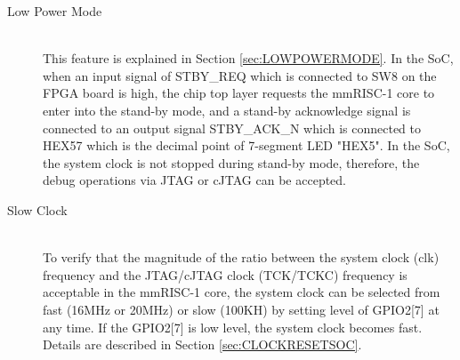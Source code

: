 \begin{description}
    \item[Low Power Mode]\mbox{}\\
    This feature is explained in Section \ref{sec:LOWPOWERMODE}. In the SoC, when an input signal of STBY\_REQ which is connected to SW8 on the FPGA board is high, the chip top layer requests the mmRISC-1 core to enter into the stand-by mode, and a stand-by acknowledge signal is connected to an output signal STBY\_ACK\_N which is connected to HEX57 which is the decimal point of 7-segment LED "HEX5". In the SoC, the system clock is not stopped during stand-by mode, therefore, the debug operations via JTAG or cJTAG can be accepted.

    \item[Slow Clock]\mbox{}\\
    To verify that the magnitude of the ratio between the system clock (clk) frequency and the JTAG/cJTAG clock (TCK/TCKC) frequency is acceptable in the mmRISC-1 core, the system clock can be selected from fast (16MHz or 20MHz) or slow (100KH) by setting level of GPIO2[7] at any time. If the GPIO2[7] is low level, the system clock becomes fast. Details are described in Section \ref{sec:CLOCKRESETSOC}.


\end{description}


